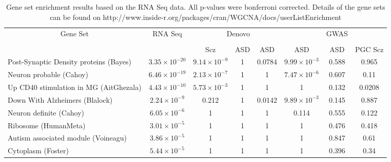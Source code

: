 
\begin{landscape}
	\setlength\LTcapwidth{\textwidth}
	\small
    \begin{longtable}{p{2.5cm}ccccccc}
    \caption{Gene set enrichment results based on the RNA Seq data. All p-values were bonferroni corrected. Details of the gene sets can be found on http://www.inside-r.org/packages/cran/WGCNA/docs/userListEnrichment }\label{tab:fullGeneSetEnrichment} \\
    
    \multicolumn{1}{c}{\multirow{3}[3]{*}{Gene Set}} & \multicolumn{1}{c}{\multirow{3}[3]{*}{RNA Seq}} & \multicolumn{2}{r}{Denovo}  &&  &\multicolumn{1}{r}{GWAS} &\\
    \cline{3-8}
    \multicolumn{1}{c}{} & \multicolumn{1}{c}{} & \multicolumn{1}{c}{\citet{Fromer2014}} & \multicolumn{1}{c}{\citet{Neale2012}} & \multicolumn{1}{c}{\citet{Sanders2012}} & \multicolumn{1}{c}{\citet{ORoak2012}}& \multicolumn{1}{c}{\citet{Anney2010a}} & \multicolumn{1}{c}{\citet{Ripke2013}} \\
    \multicolumn{1}{c}{} & \multicolumn{1}{c}{} & \multicolumn{1}{c}{Scz} & \multicolumn{1}{c}{ASD} & \multicolumn{1}{c}{ASD} & \multicolumn{1}{c}{ASD} & \multicolumn{1}{c}{ASD} & \multicolumn{1}{c}{PGC Scz} \\
    \midrule
    Post-Synaptic Density proteins (Bayes) & $3.35\times 10^{-20}$ &   $9.14\times 10^{-9}$ & 1     & 0.0784 & $9.99\times 10^{-3}$ &   0.588 & 0.965 \\
    Neuron probable (Cahoy) & $6.46\times 10^{-19}$ & $2.13\times 10^{-7}$ & 1     & 1     & $7.47\times 10^{-6}$ & 0.607 & 0.11 \\
    Up CD40 stimulation in MG (AitGhezala) & $4.43\times 10^{-10}$ & $5.73\times 10^{-3}$ & 1     & 1     & 1     &  0.132 & 0.0208 \\
    Down With Alzheimers (Blalock) & $2.24\times 10^{-9}$ &  0.212 & 1     & 0.0142 & $9.89\times 10^{-3}$ & 0.145 & 0.887 \\
    Neuron definite (Cahoy) & $6.05\times 10^{-6}$ &  1     & 1     & 1     & 0.114 &  0.555 & 0.122 \\
    Ribosome (HumanMeta) & $3.01\times 10^{-5}$ & 1     & 1     & 1     & 1     & 0.476 & 0.418 \\
    Autism associated module (Voineagu) & $3.86\times 10^{-5}$ &   1     & 1     & 1     & 1     & 0.847 & 0.61 \\
    Cytoplasm (Foster) & $5.44\times 10^{-5}$ & 1     & 1     & 1     & 1     & 0.396 & 0.34 \\

\end{longtable}
\end{landscape}
